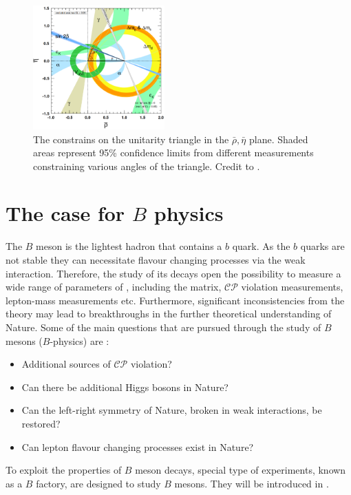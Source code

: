 \begin{figure}
    \centering
    \includegraphics[width=0.45\textwidth]{figures/sm_theory/unitarity_triangle.png}
    \caption{\label{fig:unitarity_triangle}The constrains on the unitarity triangle in the $\bar{\rho},\bar{\eta}$ plane.
    Shaded areas represent  95\% confidence limits from different measurements constraining various angles of the triangle.
    Credit to \cite{Workman:2022ynf}.
    }
\end{figure}

\section{The case for \texorpdfstring{$B$}{B} physics}\label{sec:bphysics_case}

The $B$ meson is the lightest hadron that contains a $b$ quark.
As the $b$ quarks are not stable they can necessitate flavour changing processes via the weak interaction.
Therefore, the study of its decays open the possibility to measure a wide range of parameters of \SM, including the \CKM matrix, $\mathcal{CP}$ violation measurements, lepton-mass measurements etc.
Furthermore, significant inconsistencies from the theory may lead to breakthroughs in the further theoretical understanding of Nature.
Some of the main questions that are pursued through the study of $B$ mesons ($B$-physics) are \cite{Belle-II:2018jsg}:
\begin{itemize}
    \item Additional sources of $\mathcal{CP}$ violation?
    \item Can there be additional Higgs bosons in Nature?
    \item Can the left-right symmetry of Nature, broken in weak interactions, be restored?
    \item Can lepton flavour changing processes exist in Nature?
\end{itemize}

To exploit the properties of $B$ meson decays, special type of experiments, known as a $B$ factory, are designed to study $B$ mesons.
They will be introduced in .

